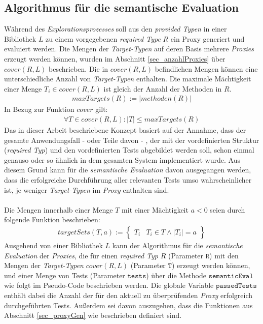 \subsection{Algorithmus für die semantische Evaluation}\label{sec_semEvalAlgo}
Während des \emph{Explorationsprozesses} soll aus den \emph{provided Typen} in einer Bibliothek $L$ zu einem vorgegebenen \emph{required Type} $R$ ein Proxy generiert und evaluiert werden. Die Mengen der \emph{Target-Typen} auf deren Basis mehrere \emph{Proxies} erzeugt werden können, wurden im Abschnitt \ref{sec_anzahlProxies} über $\mathit{cover(R,L)}$ beschrieben. Die in $\mathit{cover(R,L)}$ befindlichen Mengen können eine unterschiedliche Anzahl von \emph{Target-Typen} enthalten. Die maximale Mächtigkeit einer Menge $T_i \in \mathit{cover(R,L)}$ ist gleich der Anzahl der Methoden in $R$.
\begin{gather*}
\mathit{maxTargets(R)} := |\mathit{methoden(R)}|
\end{gather*}
\noindent
In Bezug zur Funktion $\mathit{cover}$ gilt:
\begin{gather*}
\forall T \in \mathit{cover(R,L)} : |T| \leq \mathit{maxTargets(R)}
\end{gather*}
\noindent
Das in dieser Arbeit beschriebene Konzept basiert auf der Annahme, dass der gesamte Anwendungsfall - oder Teile davon - , der mit der vordefinierten Struktur (\emph{required Typ}) und den vordefinierten Tests abgebildet werden soll, schon einmal genauso oder so ähnlich in dem gesamten System implementiert wurde. Aus diesem Grund kann für die \emph{semantische Evaluation} davon ausgegangen werden, dass die erfolgreiche Durchführung aller relevanten Tests umso wahrscheinlicher ist, je weniger \emph{Target-Typen} im \emph{Proxy} enthalten sind.
\\\\
Die Mengen innerhalb einer Menge $T$ mit einer Mächtigkeit $a < 0$ seien durch folgende Funktion beschrieben:
\begin{gather*}
\mathit{targetSets(T,a)} := 
\left\{\begin{array}{l|l}	
				T_i & T_i \in T \wedge |T_i| = a
		 \end{array}
\right\}
\end{gather*}
\noindent
Ausgehend von einer Bibliothek $L$ kann der Algorithmus für die \emph{semantische Evaluation} der \emph{Proxies}, die für einen \emph{required Typ} $R$ (Parameter $\texttt{R}$) mit den Mengen der \emph{Target-Typen} $\mathit{cover(R, L)}$ (Parameter $\texttt{T}$) erzeugt werden können, und einer Menge von Tests (Parameter $\texttt{tests}$) über die Methode $\texttt{semanticEval}$ wie folgt im Pseudo-Code beschrieben werden. Die globale Variable $\texttt{passedTests}$ enthält dabei die Anzahl der für den aktuell zu überprüfenden \emph{Proxy} erfolgreich durchgeführten Tests. Außerdem sei davon auszugehen, dass die Funktionen aus Abschnitt \ref{sec_proxyGen} wie beschrieben definiert sind.
